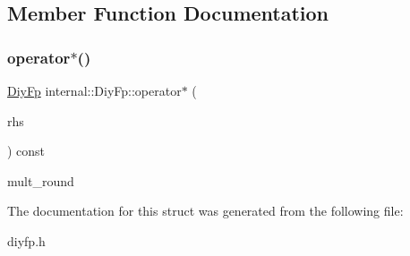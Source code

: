 \subsection{Member Function Documentation}
\mbox{\label{a02252_a9868841f824924cc385ad5163c9c85b3}} 
\subsubsection{\texorpdfstring{operator$\ast$()}{operator*()}}
{\footnotesize\ttfamily \hyperlink{a02252}{Diy\+Fp} internal\+::\+Diy\+Fp\+::operator$\ast$ (\begin{DoxyParamCaption}\item[{const \hyperlink{a02252}{Diy\+Fp} \&}]{rhs }\end{DoxyParamCaption}) const\hspace{0.3cm}{\ttfamily [inline]}}

mult\+\_\+round 

The documentation for this struct was generated from the following file\+:\begin{DoxyCompactItemize}
\item 
diyfp.\+h\end{DoxyCompactItemize}
